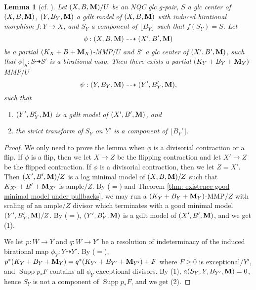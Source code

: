 \documentclass[11pt]{amsart}
\numberwithin{equation}{section}
\newcommand{\Mm}{{\bf{M}}}
\newcommand{\Supp}{\operatorname{Supp}}
\newtheorem{lem}[thm]{Lemma}
\theoremstyle{definition}
\theoremstyle{definition}
\theoremstyle{definition}
\begin{document}
\begin{lem}[{cf. \cite[3.5]{HL18}}]\label{lem: lift mmp}
Let $(X,B,\Mm)/U$ be an NQC glc g-pair, $S$ a glc center of $(X,B,\Mm)$,  $(Y,B_Y,\Mm)$ a gdlt model of $(X,B,\Mm)$ with induced birational morphism $f: Y\rightarrow X$, and $S_Y$ a component of $\lfloor B_Y\rfloor$ such that $f(S_Y)=S$. Let
$$\phi: (X,B,\Mm)\dashrightarrow (X',B',\Mm)$$
be a partial $(K_X+B+\Mm_X)$-MMP$/U$ and $S'$ a glc center of $(X',B',\Mm)$, such that $\phi|_S: S\dashrightarrow S'$ is a birational map. Then there exists a partial $(K_Y+B_Y+\Mm_Y)$-MMP$/U$
$$\psi: (Y,B_Y,\Mm)\dashrightarrow (Y',B_Y',\Mm),$$
such that
\begin{enumerate}
    \item $(Y',B_Y',\Mm)$ is a gdlt model of $(X',B',\Mm)$, and
    \item the strict transform of $S_Y$ on $Y'$ is a component of $\lfloor B_Y'\rfloor$. 
\end{enumerate}
\end{lem}
\begin{proof}
We only need to prove the lemma when $\phi$ is a divisorial contraction or a flip. If $\phi$ is a flip, then we let $X\rightarrow Z$ be the flipping contraction and let $X'\rightarrow Z$ be the flipped contraction. If $\phi$ is a divisorial contraction, then we let $Z=X'$. Then $(X',B',\Mm)/Z$ is a log minimal model of $(X,B,\Mm)/Z$ such that $K_{X'}+B'+\Mm_{X'}$ is ample$/Z$. By \cite[Lemmas 3.5, 3.8]{HL21} ($=$\cite[Version 3, Lemmas 3.9, 3.15]{HL21}) and Theorem \ref{thm: existence good minimal model under pullbacks}, we may run a $(K_{Y}+B_Y+\Mm_Y)$-MMP$/Z$ with scaling of an ample$/Z$ divisor which terminates with a good minimal model $(Y',B_Y',\Mm)/Z$. By \cite[Lemma 3.5]{HL21} ($=$\cite[Version 3, Lemma 3.9]{HL21}), $(Y',B_Y',\Mm)$ is a gdlt model of $(X',B',\Mm)$, and we get (1).

We let $p: W\rightarrow Y$ and $q: W\rightarrow Y'$ be a resolution of indeterminacy of the induced birational map $\phi_Y: Y\dashrightarrow Y'$. By \cite[Lemma 3.4]{HL21} ($=$\cite[Version 3, Lemma 3.8]{HL21}), $p^*(K_Y+B_Y+\Mm_Y)=q^*(K_{Y'}+B_{Y'}+\Mm_{Y'})+F$ where $F\geq 0$ is exceptional$/Y'$, and $\Supp p_*F$ contains all $\phi_Y$-exceptional divisors. By (1), $a(S_Y,Y,B_{Y'},\Mm)=0$, hence $S_Y$ is not a component of $\Supp p_*F$, and we get (2).
\end{proof}
\end{document}
